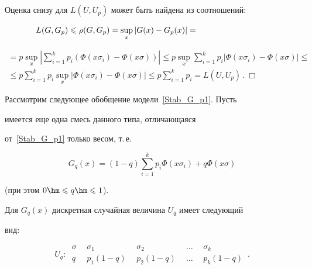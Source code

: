 Оценка снизу для $L(U,U_p)$ может быть найдена из соотношений:

\begin{equation*}

\hspace*{-20mm}L(G,G_p)\leqslant\rho(G,G_p)=\sup\limits_x|G(x)-G_p(x)|={}\hspace*{10mm}

\end{equation*}



\noindent

\begin{multline*}

{}=p\sup\limits_x\left|\sum\limits_{i=1}^k

p_i(\Phi(x\sigma_i)-\Phi(x\sigma))\right|

\leqslant p\sup\limits_x\sum\limits_{i=1}^k

p_i|\Phi(x\sigma_i)-\Phi(x\sigma)|\leqslant{}\\

{}\leqslant p\sum\limits_{i=1}^k

p_i\sup\limits_x|\Phi(x\sigma_i)-\Phi(x\sigma)|\leqslant

p\sum\limits_{i=1}^k p_i= L(U,U_p)\,.~\Box

\end{multline*}





\medskip



Рассмотрим следующее обобщение модели~\eqref{Stab_G_p1}. Пусть

имеется еще одна смесь данного типа, отличающаяся

от~\eqref{Stab_G_p1} только весом, т.\,е.\ 

\begin{equation}

\label{Stab_G_q1}

G_q(x)=(1-q)\sum\limits_{i=1}^k

p_i\Phi(x\sigma_i)+q\Phi(x\sigma)

\end{equation}

(при этом $0\hm\leqslant q\hm\leqslant 1$).



Для $G_q(x)$ дискретная случайная величина $U_q$ имеет следующий

вид:

\begin{equation}

\label{Stab_U_q1} 

U_q:\

\begin{array}{ccccc}

\sigma\ \ &\sigma_1\ \ &\sigma_2\ \ &\ldots\ \ &\sigma_k\\[9pt]

q\ \ &p_1(1-q)\ \ &p_2(1-q)\ \ &\ldots\ \ &p_k(1-q)

\end{array}\,.

\end{equation}



